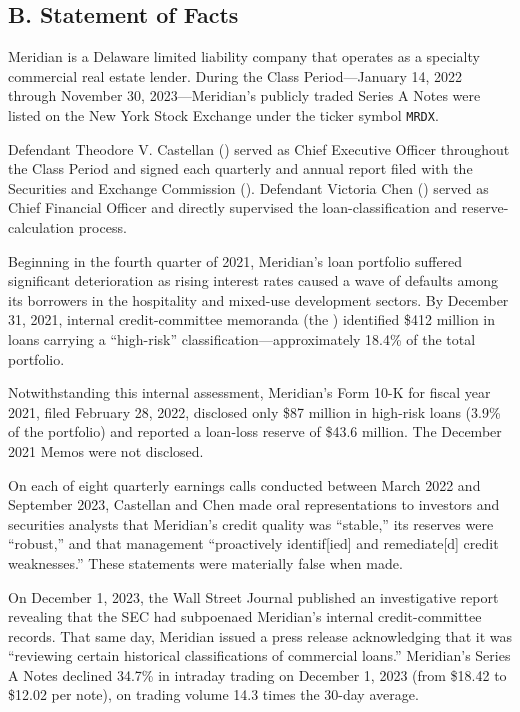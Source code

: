\documentclass[12pt,letterpaper]{article}
\begin{document}
\subsection*{B. Statement of Facts}

\begin{factlist}

\item Meridian is a Delaware limited liability company that operates as a specialty commercial real estate lender. During the Class Period---January 14, 2022 through November 30, 2023---Meridian's publicly traded Series A Notes were listed on the New York Stock Exchange under the ticker symbol \texttt{MRDX}.

\item Defendant Theodore V. Castellan () served as Chief Executive Officer throughout the Class Period and signed each quarterly and annual report filed with the Securities and Exchange Commission (). Defendant Victoria Chen () served as Chief Financial Officer and directly supervised the loan-classification and reserve-calculation process.

\item Beginning in the fourth quarter of 2021, Meridian's loan portfolio suffered significant deterioration as rising interest rates caused a wave of defaults among its borrowers in the hospitality and mixed-use development sectors. By December 31, 2021, internal credit-committee memoranda (the ) identified \$412 million in loans carrying a ``high-risk'' classification---approximately 18.4\% of the total portfolio.

\item Notwithstanding this internal assessment, Meridian's Form 10-K for fiscal year 2021, filed February 28, 2022, disclosed only \$87 million in high-risk loans (3.9\% of the portfolio) and reported a loan-loss reserve of \$43.6 million. The December 2021 Memos were not disclosed.

\item On each of eight quarterly earnings calls conducted between March 2022 and September 2023, Castellan and Chen made oral representations to investors and securities analysts that Meridian's credit quality was ``stable,'' its reserves were ``robust,'' and that management ``proactively identif[ied] and remediate[d] credit weaknesses.'' These statements were materially false when made.

\item On December 1, 2023, the Wall Street Journal published an investigative report revealing that the SEC had subpoenaed Meridian's internal credit-committee records. That same day, Meridian issued a press release acknowledging that it was ``reviewing certain historical classifications of commercial loans.'' Meridian's Series A Notes declined 34.7\% in intraday trading on December 1, 2023 (from \$18.42 to \$12.02 per note), on trading volume 14.3 times the 30-day average.


\end{factlist}
\end{document}
